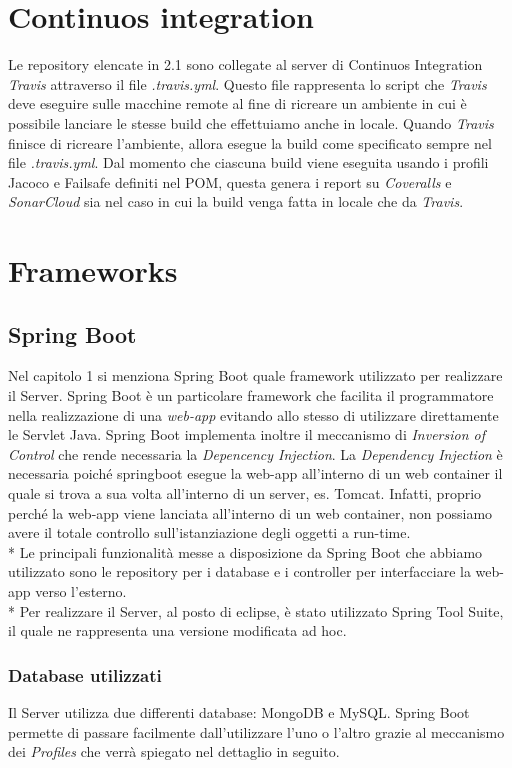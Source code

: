 \section{Continuos integration}
Le repository elencate in 2.1 sono collegate al server di Continuos Integration \emph{Travis} attraverso il file \emph{.travis.yml}. Questo file rappresenta lo script che \emph{Travis} deve eseguire sulle macchine remote al fine di ricreare un ambiente in cui \`e possibile lanciare le stesse build che effettuiamo anche in locale. Quando \emph{Travis} finisce di ricreare l'ambiente, allora esegue la build come specificato sempre nel file \emph{.travis.yml}. Dal momento che ciascuna build viene eseguita usando i profili Jacoco e Failsafe definiti nel POM, questa genera i report su \emph{Coveralls} e \emph{SonarCloud} sia nel caso in cui la build venga fatta in locale che da \emph{Travis}. 
\section{Frameworks}
\subsection{Spring Boot}
Nel capitolo 1 si menziona Spring Boot quale framework utilizzato per realizzare il Server. Spring Boot \`e un particolare framework che facilita il programmatore nella realizzazione di una \emph{web-app} evitando allo stesso di utilizzare direttamente le Servlet Java. Spring Boot implementa inoltre il meccanismo di \emph{Inversion of Control} che rende necessaria la \emph{Depencency Injection}. La \emph{Dependency Injection} \`e necessaria poich\'e springboot esegue la web-app all'interno di un web container il quale si trova a sua volta all'interno di un server, es. Tomcat. Infatti, proprio perch\'e la web-app viene lanciata all'interno di un web container, non possiamo avere il totale controllo sull'istanziazione degli oggetti a run-time.\\*
Le principali funzionalit\`a messe a disposizione da Spring Boot che abbiamo utilizzato sono le repository per i database e i controller per interfacciare la web-app verso l'esterno.\\*
Per realizzare il Server, al posto di eclipse, \`e stato utilizzato Spring Tool Suite, il quale ne rappresenta una versione modificata ad hoc.
\subsubsection{Database utilizzati}
Il Server utilizza due differenti database: MongoDB e MySQL. Spring Boot permette di passare facilmente dall'utilizzare l'uno o l'altro grazie al meccanismo dei \emph{Profiles} che verr\`a spiegato nel dettaglio in seguito.
